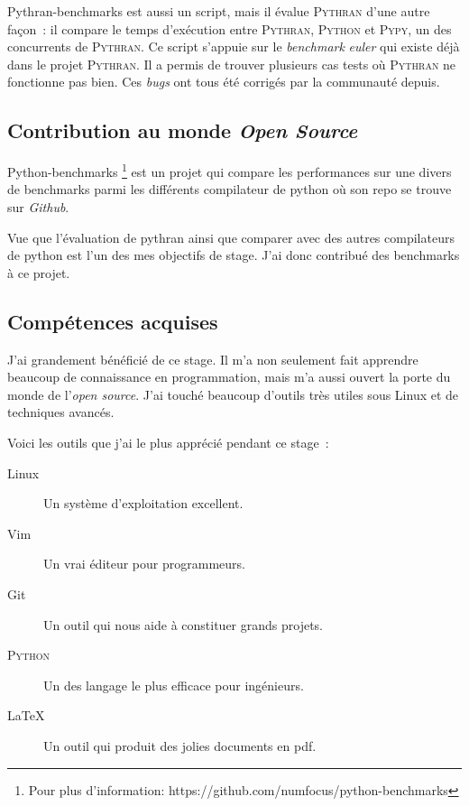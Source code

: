 \documentclass[a4paper, 11pt]{article}
\newcommand\Pythran{\textsc{Pythran}}
\newcommand\Python{\textsc{Python}}
\newcommand\Pypy{\textsc{Pypy}}
\begin{document}
Pythran-benchmarks est aussi un script, mais il évalue \Pythran{} d'une autre
façon~: il compare le temps d'exécution entre \Pythran{}, \Python{} et \Pypy{},
un des concurrents de \Pythran{}. Ce script s'appuie sur le \emph{benchmark}
\emph{euler} qui existe déjà dans le projet \Pythran{}. Il a permis de trouver plusieurs
cas tests où \Pythran{} ne fonctionne pas bien. Ces \emph{bugs} ont tous été corrigés par la communauté depuis.

\subsection*{Contribution au monde \emph{Open Source}}
Python-benchmarks \footnote{Pour plus d'information: https://github.com/numfocus/python-benchmarks}
est un projet qui compare les performances sur une divers de
benchmarks parmi les différents compilateur de python où son repo se trouve 
sur \emph{Github}.

Vue que l'évaluation de pythran ainsi que comparer avec des autres compilateurs
de python est l'un des mes objectifs de stage. J'ai donc contribué des
benchmarks à ce projet.


\subsection*{Compétences acquises}

J'ai grandement bénéficié de ce stage. Il m'a non seulement fait
apprendre beaucoup de connaissance en programmation, mais m'a aussi ouvert la
porte du monde de l'\emph{open source}. J'ai touché beaucoup d'outils très utiles sous Linux et de
techniques avancés.

Voici les outils que j'ai le plus apprécié pendant ce stage~:


\begin{description}
  \item[Linux] \hfill
    Un système d'exploitation excellent.
  \item[Vim] \hfill
    Un vrai éditeur pour programmeurs.
  \item[Git] \hfill
    Un outil qui nous aide à constituer grands projets.
  \item[\Python{}] \hfill
    Un des langage le plus efficace pour ingénieurs.
  \item[\LaTeX] \hfill
    Un outil qui produit des jolies documents en pdf.
\end{description}
\end{document}
